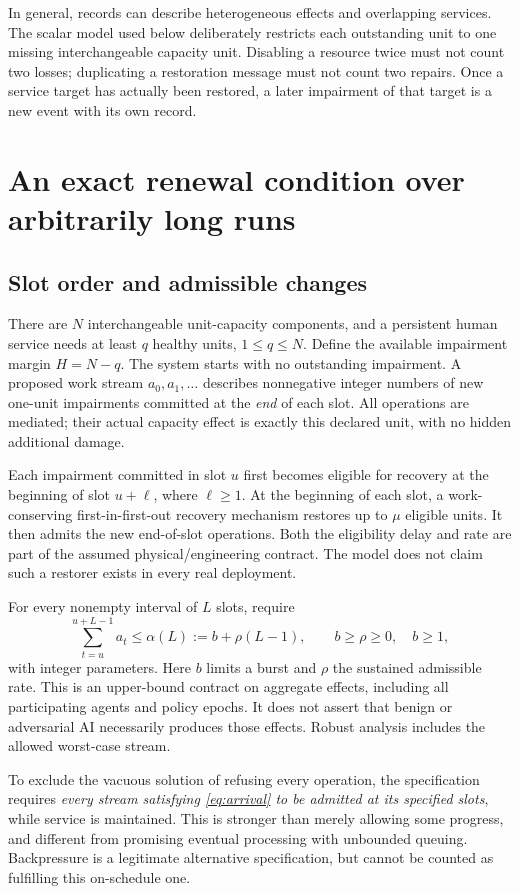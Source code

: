 \documentclass[11pt,a4paper]{article}
\theoremstyle{definition}\newtheorem{definition}{Definition}
\begin{document}
In general, records can describe heterogeneous effects and overlapping services. The scalar model used below deliberately restricts each outstanding unit to one missing interchangeable capacity unit. Disabling a resource twice must not count two losses; duplicating a restoration message must not count two repairs. Once a service target has actually been restored, a later impairment of that target is a new event with its own record.

\section{An exact renewal condition over arbitrarily long runs}
\label{sec:rate}
\subsection{Slot order and admissible changes}
There are $N$ interchangeable unit-capacity components, and a persistent human service needs at least $q$ healthy units, $1\le q\le N$. Define the available impairment margin $H=N-q$. The system starts with no outstanding impairment. A proposed work stream $a_0,a_1,\ldots$ describes nonnegative integer numbers of new one-unit impairments committed at the \emph{end} of each slot. All operations are mediated; their actual capacity effect is exactly this declared unit, with no hidden additional damage.

Each impairment committed in slot $u$ first becomes eligible for recovery at the beginning of slot $u+\ell$, where $\ell\ge1$. At the beginning of each slot, a work-conserving first-in-first-out recovery mechanism restores up to $\mu$ eligible units. It then admits the new end-of-slot operations. Both the eligibility delay and rate are part of the assumed physical/engineering contract. The model does not claim such a restorer exists in every real deployment.

For every nonempty interval of $L$ slots, require
\begin{equation}
 \sum_{t=u}^{u+L-1} a_t\le\alpha(L):=b+\rho(L-1),\qquad b\ge\rho\ge0,\quad b\ge1,
 \label{eq:arrival}
\end{equation}
with integer parameters. Here $b$ limits a burst and $\rho$ the sustained admissible rate. This is an upper-bound contract on aggregate effects, including all participating agents and policy epochs. It does not assert that benign or adversarial AI necessarily produces those effects. Robust analysis includes the allowed worst-case stream.

To exclude the vacuous solution of refusing every operation, the specification requires \emph{every stream satisfying \cref{eq:arrival} to be admitted at its specified slots}, while service is maintained. This is stronger than merely allowing some progress, and different from promising eventual processing with unbounded queuing. Backpressure is a legitimate alternative specification, but cannot be counted as fulfilling this on-schedule one.
\end{document}
